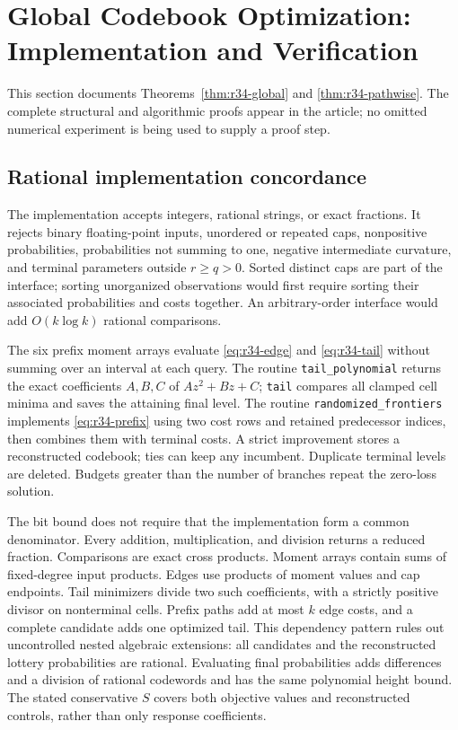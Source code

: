 \section{Global Codebook Optimization: Implementation and Verification}\label{sec:ec-r34}
This section documents Theorems~\ref{thm:r34-global} and \ref{thm:r34-pathwise}. The complete structural and algorithmic proofs appear in the article; no omitted numerical experiment is being used to supply a proof step.

\subsection{Rational implementation concordance}
The implementation accepts integers, rational strings, or exact fractions. It rejects binary floating-point inputs, unordered or repeated caps, nonpositive probabilities, probabilities not summing to one, negative intermediate curvature, and terminal parameters outside $r\geq q>0$. Sorted distinct caps are part of the interface; sorting unorganized observations would first require sorting their associated probabilities and costs together. An arbitrary-order interface would add $O(k\log k)$ rational comparisons.

The six prefix moment arrays evaluate \eqref{eq:r34-edge} and \eqref{eq:r34-tail} without summing over an interval at each query. The routine \texttt{tail\_polynomial} returns the exact coefficients $A,B,C$ of $Az^2+Bz+C$; \texttt{tail} compares all clamped cell minima and saves the attaining final level. The routine \texttt{randomized\_frontiers} implements \eqref{eq:r34-prefix} using two cost rows and retained predecessor indices, then combines them with terminal costs. A strict improvement stores a reconstructed codebook; ties can keep any incumbent. Duplicate terminal levels are deleted. Budgets greater than the number of branches repeat the zero-loss solution.

The bit bound does not require that the implementation form a common denominator. Every addition, multiplication, and division returns a reduced fraction. Comparisons are exact cross products. Moment arrays contain sums of fixed-degree input products. Edges use products of moment values and cap endpoints. Tail minimizers divide two such coefficients, with a strictly positive divisor on nonterminal cells. Prefix paths add at most $k$ edge costs, and a complete candidate adds one optimized tail. This dependency pattern rules out uncontrolled nested algebraic extensions: all candidates and the reconstructed lottery probabilities are rational. Evaluating final probabilities adds differences and a division of rational codewords and has the same polynomial height bound. The stated conservative $S$ covers both objective values and reconstructed controls, rather than only response coefficients.

